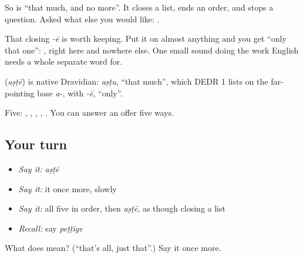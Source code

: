 So  is \textquotedblleft{}that much, and no more\textquotedblright{}. It closes a list, ends an order, and stops a question. Asked what else you would like: .

That closing \emph{-ē} is worth keeping. Put it on almost anything and you get \textquotedblleft{}only that one\textquotedblright{}: , right here and nowhere else. One small sound doing the work English needs a whole separate word for.

\begin{cousinweb}
\textbf{} (\emph{aṣṭē}) is native Dravidian: \emph{aṣṭu}, \textquotedblleft{}that much\textquotedblright{}, which DEDR 1 lists on the far-pointing base \emph{a-}, with \emph{-ē}, \textquotedblleft{}only\textquotedblright{}.
\end{cousinweb}

\begin{grammarlens}[title={What you've built}]
Five: , , , , . You can answer an offer five ways.
\end{grammarlens}

\subsection*{Your turn}
\begin{itemize}
\raggedright
  \item \emph{Say it:} \emph{aṣṭē}
  \item \emph{Say it:} it once more, slowly
  \item \emph{Say it:} all five in order, then \emph{aṣṭē}, as though closing a list
  \item \emph{Recall:} say \emph{peṭṭige}
\end{itemize}

\begin{tcolorbox}[breakable,colback=teal!4,colframe=teal!35!black,title={Before you move on}]
What does  mean? (\textquotedblleft{}that's all, just that\textquotedblright{}.) Say it once more.
\end{tcolorbox}
